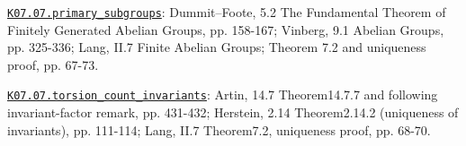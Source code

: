 \par\smallskip\noindent\hypertarget{src:K07.07.primary_subgroups}{}\label{src:K07.07.primary_subgroups}\hyperref[K07.07.primary_subgroups]{\texttt{K07.07.primary\_subgroups}}: Dummit--Foote, 5.2 The Fundamental Theorem of Finitely Generated Abelian Groups, pp. 158-167; Vinberg, 9.1 Abelian Groups, pp. 325-336; Lang, II.7 Finite Abelian Groups; Theorem 7.2 and uniqueness proof, pp. 67-73.
\par\smallskip\noindent\hypertarget{src:K07.07.torsion_count_invariants}{}\label{src:K07.07.torsion_count_invariants}\hyperref[K07.07.torsion_count_invariants]{\texttt{K07.07.torsion\_count\_invariants}}: Artin, 14.7 Theorem14.7.7 and following invariant-factor remark, pp. 431-432; Herstein, 2.14 Theorem2.14.2 (uniqueness of invariants), pp. 111-114; Lang, II.7 Theorem7.2, uniqueness proof, pp. 68-70.
